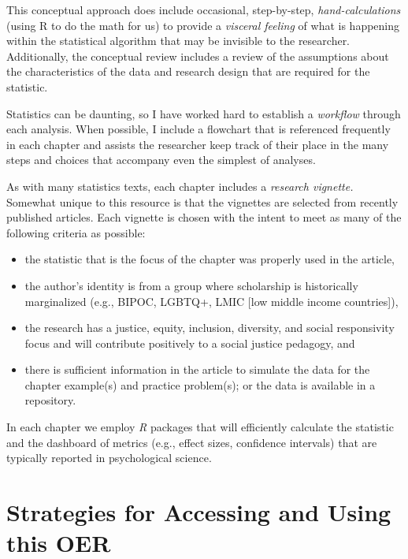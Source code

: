 \documentclass[
  11pt,
]{book}
\providecommand{\tightlist}{%
  \setlength{\itemsep}{0pt}\setlength{\parskip}{0pt}}
\begin{document}
This conceptual approach does include occasional, step-by-step, \emph{hand-calculations} (using R to do the math for us) to provide a \emph{visceral feeling} of what is happening within the statistical algorithm that may be invisible to the researcher. Additionally, the conceptual review includes a review of the assumptions about the characteristics of the data and research design that are required for the statistic.

Statistics can be daunting, so I have worked hard to establish a \emph{workflow} through each analysis. When possible, I include a flowchart that is referenced frequently in each chapter and assists the researcher keep track of their place in the many steps and choices that accompany even the simplest of analyses.

As with many statistics texts, each chapter includes a \emph{research vignette.} Somewhat unique to this resource is that the vignettes are selected from recently published articles. Each vignette is chosen with the intent to meet as many of the following criteria as possible:

\begin{itemize}
\tightlist
\item
  the statistic that is the focus of the chapter was properly used in the article,
\item
  the author's identity is from a group where scholarship is historically marginalized (e.g., BIPOC, LGBTQ+, LMIC {[}low middle income countries{]}),
\item
  the research has a justice, equity, inclusion, diversity, and social responsivity focus and will contribute positively to a social justice pedagogy, and
\item
  there is sufficient information in the article to simulate the data for the chapter example(s) and practice problem(s); or the data is available in a repository.
\end{itemize}

In each chapter we employ \emph{R} packages that will efficiently calculate the statistic and the dashboard of metrics (e.g., effect sizes, confidence intervals) that are typically reported in psychological science.

\hypertarget{strategies-for-accessing-and-using-this-oer}{%
\section{Strategies for Accessing and Using this OER}\label{strategies-for-accessing-and-using-this-oer}}
\end{document}
